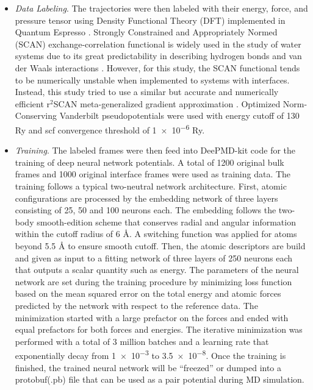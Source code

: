 \begin{itemize}
    \item \emph{Data Labeling}.
          The trajectories were then labeled with their energy, force, and
          pressure
          tensor using Density Functional Theory (DFT) implemented in Quantum
          Espresso
          \cite{QE-2009,QE-2017,QE-2020}. Strongly Constrained and
          Appropriately
          Normed
          (SCAN) exchange-correlation functional is widely used in the study of
          water
          systems due to its great predictability in describing hydrogen bonds
          and
          van
          der Waals interactions \cite{sun2015strongly, chen2017ab}. However,
          for
          this
          study, the SCAN functional tends to be numerically unstable when
          implemented
          to systems with interfaces. Instead, this study tried to use a
          similar but accurate
          and
          numerically efficient r$^2$SCAN meta-generalized gradient
          approximation
          \cite{Furness2020}. Optimized Norm-Conserving Vanderbilt
          pseudopotentials
          \cite{hamann2013optimized} were used with energy cutoff of 130 Ry and
          scf
          convergence threshold of \num{1e-6} Ry.

    \item \emph{Training}. The labeled frames were then feed into DeePMD-kit
          code
          \cite{wang2018deepmd,zeng2023deepmd,lu2021,zhang2018end} for the
          training
          of
          deep neural network potentials. A total of 1200 original bulk frames
          and 1000 original
          interface
          frames were used as training data. The training follows a typical
          two-neutral
          network architecture. First, atomic configurations are processed by
          the
          embedding network of three layers consisting of 25, 50 and 100
          neurons
          each.
          The embedding follows the two-body smooth-edition scheme
          \cite{zhang2018end}
          that conserves radial and angular information within the cutoff
          radius of 6
          \r{A}. A switching function was applied for atoms beyond 5.5 \r{A} to
          ensure
          smooth cutoff.	Then, the atomic descriptors are build and
          given as
          input to a
          fitting network of three layers of 250 neurons each that outputs a
          scalar
          quantity such as energy. The parameters of the neural network are
          set
          during
          the training procedure by minimizing	loss function based on the mean
          squared
          error on the total energy and atomic forces predicted
          by the network with respect to the reference data. The minimization
          started with a large prefactor on the forces and ended with equal
          prefactors
          for both forces and energies.    The iterative
          minimization
          was performed with a total of 3 million batches and a learning rate
          that
          exponentially decay from \num{1e-3} to \num{3.5e-8}. Once the
          training is finished, the trained neural network will be  ``freezed''
          or dumped into a protobuf(.pb) file that can be used as a pair
          potential during MD simulation.


\end{itemize}
